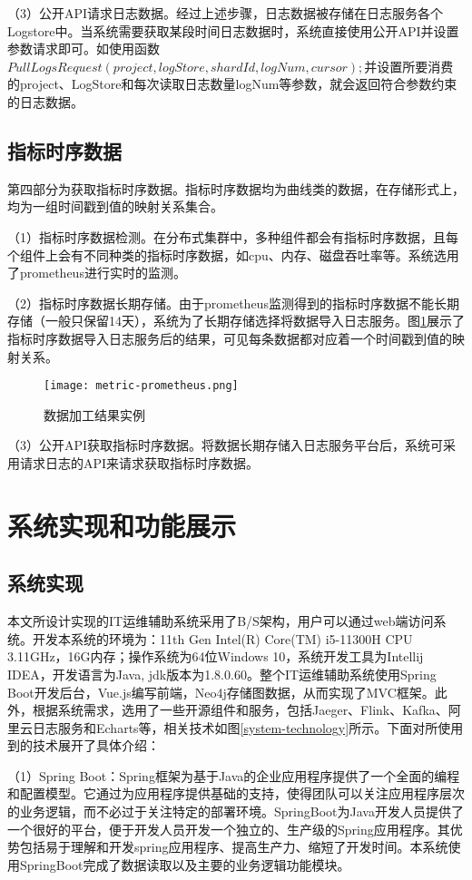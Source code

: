 （3）公开API请求日志数据。经过上述步骤，日志数据被存储在日志服务各个Logstore中。当系统需要获取某段时间日志数据时，系统直接使用公开API并设置参数请求即可。如使用函数$PullLogsRequest(project, logStore, shardId, logNum, cursor);$并设置所要消费的project、LogStore和每次读取日志数量logNum等参数，就会返回符合参数约束的日志数据。

\subsection{指标时序数据}
第四部分为获取指标时序数据。指标时序数据均为曲线类的数据，在存储形式上，均为一组时间戳到值的映射关系集合。

（1）指标时序数据检测。在分布式集群中，多种组件都会有指标时序数据，且每个组件上会有不同种类的指标时序数据，如cpu、内存、磁盘吞吐率等。系统选用了prometheus进行实时的监测。

（2）指标时序数据长期存储。由于prometheus监测得到的指标时序数据不能长期存储（一般只保留14天），系统为了长期存储选择将数据导入日志服务。图\ref{metric-prometheus}展示了指标时序数据导入日志服务后的结果，可见每条数据都对应着一个时间戳到值的映射关系。

\begin{figure}[htbp]
    \centering
    \texttt{[image: metric-prometheus.png]}
    \caption{数据加工结果实例\label{metric-prometheus}}
\end{figure}
（3）公开API获取指标时序数据。将数据长期存储入日志服务平台后，系统可采用请求日志的API来请求获取指标时序数据。

\section{系统实现和功能展示}
\subsection{系统实现}
本文所设计实现的IT运维辅助系统采用了B/S架构，用户可以通过web端访问系统。开发本系统的环境为：11th Gen Intel(R) Core(TM) i5-11300H CPU 3.11GHz，16G内存；操作系统为64位Windows 10，系统开发工具为Intellij IDEA，开发语言为Java, jdk版本为1.8.0.60。整个IT运维辅助系统使用Spring Boot开发后台，Vue.js编写前端，Neo4j存储图数据，从而实现了MVC框架。此外，根据系统需求，选用了一些开源组件和服务，包括Jaeger、Flink、Kafka、阿里云日志服务和Echarts等，相关技术如图\ref{system-technology}所示。下面对所使用到的技术展开了具体介绍：

（1）Spring Boot：Spring框架为基于Java的企业应用程序提供了一个全面的编程和配置模型。它通过为应用程序提供基础的支持，使得团队可以关注应用程序层次的业务逻辑，而不必过于关注特定的部署环境。SpringBoot为Java开发人员提供了一个很好的平台，便于开发人员开发一个独立的、生产级的Spring应用程序。其优势包括易于理解和开发spring应用程序、提高生产力、缩短了开发时间。本系统使用SpringBoot完成了数据读取以及主要的业务逻辑功能模块。

